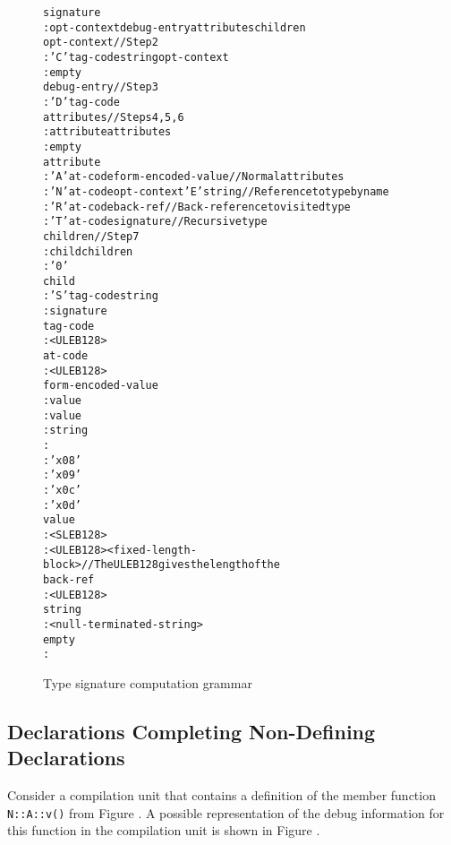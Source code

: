 \begin{figure}[h]
\begin{dwflisting}
\begin{alltt}
signature
    : opt-context debug-entry attributes children
opt-context               // Step 2
    : 'C' tag-code string opt-context
    : empty
debug-entry               // Step 3
    : 'D' tag-code
attributes                // Steps 4, 5, 6
    : attribute attributes
    : empty
attribute
    : 'A' at-code form-encoded-value     // Normal attributes
    : 'N' at-code opt-context 'E' string // Reference to type by name
    : 'R' at-code back-ref               // Back-reference to visited type
    : 'T' at-code signature              // Recursive type
children                 //  Step 7
    : child children
    : '0'
child
    : 'S' tag-code string
    : signature
tag-code
    : <ULEB128>
at-code
    : <ULEB128>
form-encoded-value
    : \DWFORMsdata value 
    : \DWFORMflag value 
    : \DWFORMstring string 
    : \DWFORMblock {} 
\DWFORMstring {}
    : 'x08'
\DWFORMblock  {}
    : 'x09'
\DWFORMflag {}
    : 'x0c'
\DWFORMsdata {}
    : 'x0d'
value
    : <SLEB128>
    : <ULEB128> <fixed-length-block> // The ULEB128 gives the length of the 
back-ref
    : <ULEB128>
string
    : <null-terminated-string>
empty
    :
\end{alltt}
\end{dwflisting}
\caption{Type signature computation grammar}
\label{fig:typesignaturecomputationgrammar}
\end{figure}

\clearpage
\subsection{Declarations Completing Non-Defining Declarations}
\label{app:declarationscompletingnondefiningdeclarations}
Consider a compilation unit that contains a definition of the member
function \texttt{N::A::v()} from 
Figure . 
A possible representation of the
debug information for this function in the compilation unit is shown
in Figure .

